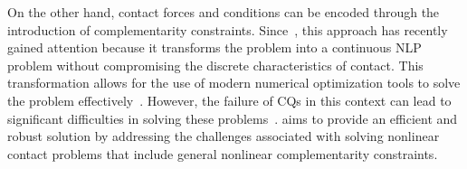 On the other hand, contact forces and conditions can be encoded through the introduction of complementarity constraints. Since~\cite{posa2014ijrr-traopt-directmethod-contact}, this approach has recently gained attention because it transforms the problem into a continuous NLP problem without compromising the discrete characteristics of contact. This transformation allows for the use of modern numerical optimization tools to solve the problem effectively~\cite{le2024fast, RSS-yang-2024, aydinoglu2023icra-realtime-multicontact-mpc-admm}. However, the failure of CQs in this context can lead to significant difficulties in solving these problems~\cite{fletcher2000practical, SIOPT-FLETCHER-2006, OMS-Fletcher-2004}. \crisp aims to provide an efficient and robust solution by addressing the challenges associated with solving nonlinear contact problems that include general nonlinear complementarity constraints.